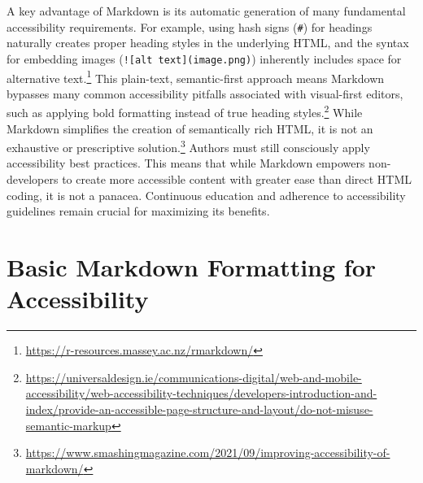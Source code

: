 A key advantage of Markdown is its automatic generation of many fundamental accessibility requirements. For example, using hash signs (\texttt{\#}) for headings naturally creates proper heading styles in the underlying HTML, and the syntax for embedding images (\texttt{![alt text](image.png)}) inherently includes space for alternative text.\footnote{\url{https://r-resources.massey.ac.nz/rmarkdown/}} This plain-text, semantic-first approach means Markdown bypasses many common accessibility pitfalls associated with visual-first editors, such as applying bold formatting instead of true heading styles.\footnote{\url{https://universaldesign.ie/communications-digital/web-and-mobile-accessibility/web-accessibility-techniques/developers-introduction-and-index/provide-an-accessible-page-structure-and-layout/do-not-misuse-semantic-markup}} While Markdown simplifies the creation of semantically rich HTML, it is not an exhaustive or prescriptive solution.\footnote{\url{https://www.smashingmagazine.com/2021/09/improving-accessibility-of-markdown/}} Authors must still consciously apply accessibility best practices. This means that while Markdown empowers non-developers to create more accessible content with greater ease than direct HTML coding, it is not a panacea. Continuous education and adherence to accessibility guidelines remain crucial for maximizing its benefits.

\section{Basic Markdown Formatting for Accessibility}
\label{sec:markdown-formatting}

